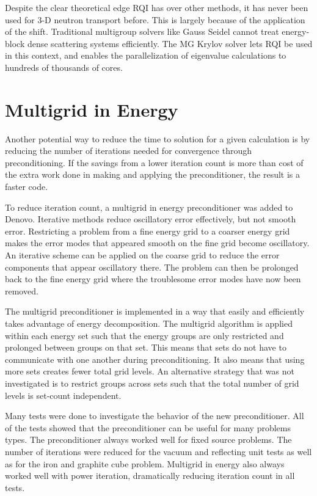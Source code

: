 Despite the clear theoretical edge RQI has over other methods, it has never been used for 3-D neutron transport before. This is largely because of the application of the shift. Traditional multigroup solvers like Gauss Seidel cannot treat energy-block dense scattering systems efficiently. The MG Krylov solver lets RQI be used in this context, and enables the parallelization of eigenvalue calculations to hundreds of thousands of cores. 

\section{Multigrid in Energy}
Another potential way to reduce the time to solution for a given calculation is by reducing the number of iterations needed for convergence through preconditioning. If the savings from a lower iteration count is more than cost of the extra work done in making and applying the preconditioner, the result is a faster code. 

To reduce iteration count, a multigrid in energy preconditioner was added to Denovo. Iterative methods reduce oscillatory error effectively, but not smooth error. Restricting a problem from a fine energy grid to a coarser energy grid makes the error modes that appeared smooth on the fine grid become oscillatory. An iterative scheme can be applied on the coarse grid to reduce the error components that appear oscillatory there. The problem can then be prolonged back to the fine energy grid where the troublesome error modes have now been removed. 

The multigrid preconditioner is implemented in a way that easily and efficiently takes advantage of energy decomposition. The multigrid algorithm is applied within each energy set such that the energy groups are only restricted and prolonged between groups on that set. This means that sets do not have to communicate with one another during preconditioning. It also means that using more sets creates fewer total grid levels. An alternative strategy that was not investigated is to restrict groups across sets such that the total number of grid levels is set-count independent. 

Many tests were done to investigate the behavior of the new preconditioner. All of the tests showed that the preconditioner can be useful for many problems types. The preconditioner always worked well for fixed source problems. The number of iterations were reduced for the vacuum and reflecting unit tests as well as for the iron and graphite cube problem. Multigrid in energy also always worked well with power iteration, dramatically reducing iteration count in all tests. 

